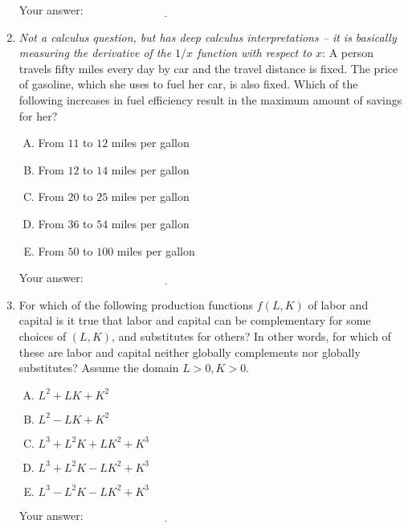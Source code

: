 \documentclass[10pt]{amsart}
\begin{document}
\begin{enumerate}
  \vspace{0.05in}
  Your answer: $\underline{\qquad\qquad\qquad\qquad\qquad\qquad\qquad}$
  \vspace{0.05in}

\item {\em Not a calculus question, but has deep calculus
  interpretations -- it is basically measuring the derivative of the
  $1/x$ function with respect to $x$}: A person travels fifty miles
  every day by car and the travel distance is fixed. The price of
  gasoline, which she uses to fuel her car, is also fixed. Which of
  the following increases in fuel efficiency result in the maximum
  amount of savings for her?

  \begin{enumerate}[(A)]
  \item From $11$ to $12$ miles per gallon
  \item From $12$ to $14$ miles per gallon
  \item From $20$ to $25$ miles per gallon
  \item From $36$ to $54$ miles per gallon
  \item From $50$ to $100$ miles per gallon
  \end{enumerate}

  \vspace{0.05in}
  Your answer: $\underline{\qquad\qquad\qquad\qquad\qquad\qquad\qquad}$
  \vspace{0.05in}

\item For which of the following production functions $f(L,K)$ of
  labor and capital is it true that labor and capital can be
  complementary for some choices of $(L,K)$, and substitutes for
  others? In other words, for which of these are labor and capital
  neither globally complements nor globally substitutes? Assume the
  domain $L > 0, K > 0$.

  \begin{enumerate}[(A)]
  \item $L^2 + LK + K^2$
  \item $L^2 - LK + K^2$
  \item $L^3 + L^2K + LK^2 + K^3$
  \item $L^3 + L^2K - LK^2 + K^3$
  \item $L^3 - L^2K - LK^2 + K^3$
  \end{enumerate}

  \vspace{0.05in}
  Your answer: $\underline{\qquad\qquad\qquad\qquad\qquad\qquad\qquad}$
  \vspace{0.05in}


\end{enumerate}
\end{document}
